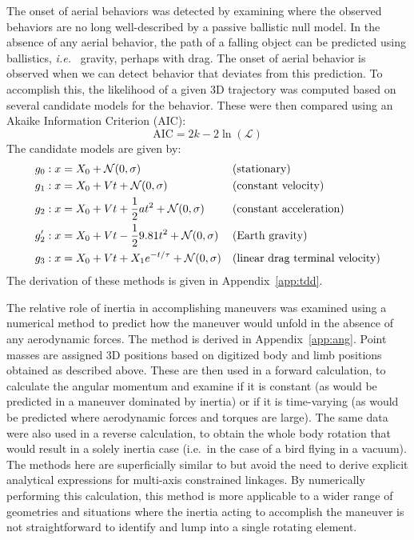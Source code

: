 The onset of aerial behaviors was detected by examining where the observed behaviors are no long well-described by a passive ballistic null model.  In the absence of any aerial behavior, the path of a falling object can be predicted using ballistics, \emph{i.e.\ } gravity, perhaps with drag.  The onset of aerial behavior is observed when we can detect behavior that deviates from this prediction.  To accomplish this, the likelihood of a given 3D trajectory was computed based on several candidate models for the behavior.  These were then compared using an Akaike Information Criterion (AIC):  
\begin{equation}
\mbox{AIC} = 2 k - 2 \ln(\mathcal{L})
\end{equation}
The candidate models are given by:
\begin{align}
\notag g_0:  x &= X_0 + \mathcal{N}(0,\sigma)& &\text{(stationary)}\\
\notag g_1:  x &= X_0 + V t + \mathcal{N}(0,\sigma)& &\text{(constant velocity)}\\
\notag g_2:  x &= X_0 + V t + \frac{1}{2}a t^2 + \mathcal{N}(0,\sigma)& &\text{(constant acceleration)}\\
\notag g_2':  x &= X_0 + V t - \frac{1}{2} \num{9.81} t^2 + \mathcal{N}(0,\sigma)& &\text{(Earth gravity)}\\
\notag g_3:  x &= X_0 + V t + X_1 e^{-t/\tau} + \mathcal{N}(0,\sigma)& &\text{(linear drag terminal velocity)}
\end{align}
 The derivation of these methods is given in Appendix~\ref{app:tdd}.

The relative role of inertia in accomplishing maneuvers was examined using a numerical method to predict how the maneuver would unfold in the absence of any aerodynamic forces.  The method is derived in Appendix~\ref{app:ang}.  Point masses are assigned 3D positions based on digitized body and limb positions obtained as described above.  These are then used in a forward calculation, to calculate the angular momentum and examine if it is constant (as would be predicted in a maneuver dominated by inertia) or if it is time-varying (as would be predicted where aerodynamic forces and torques are large).  The same data were also used in a reverse calculation, to obtain the whole body rotation that would result in a solely inertia case (i.e.\ in the case of a bird flying in a vacuum).  The methods here are superficially similar to \citep{Jusufi:2008, Bergou:2011} but avoid the need to derive explicit analytical expressions for multi-axis constrained linkages.  By numerically performing this calculation, this method is more applicable to a wider range of geometries and situations where the inertia acting to accomplish the maneuver is not straightforward to identify and lump into a single rotating element. 



